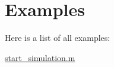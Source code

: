 \section{Examples}
Here is a list of all examples:\begin{DoxyCompactItemize}
\item 
\hyperlink{start_simulation_8m-example}{start\_\-simulation.m}
\end{DoxyCompactItemize}
